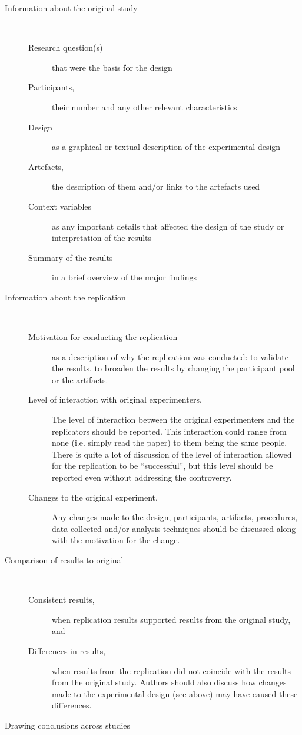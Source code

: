 \documentclass{uvamscse}
\begin{document}
\begin{description}
  \item[Information about the original study]~\\
    \begin{description}
    \item[Research question(s)] that were the basis for the design
    \item[Participants,] their number and any other relevant characteristics
    \item[Design] as a graphical or textual description of the experimental design
    \item[Artefacts,] the description of them and/or links to the artefacts used
    \item[Context variables] as any important details that affected the design of the study or interpretation of the
results
    \item[Summary of the results] in a brief overview of the major findings
    \end{description}
  \item[Information about the replication]~\\
    \begin{description}
    \item[Motivation for conducting the replication] as a
description of why the replication was conducted:
to validate the results, to broaden the results by
changing the participant pool or the artifacts.
    \item[Level of interaction with original experimenters.]
The level of interaction between the original experimenters and the
replicators should be reported. This interaction could range from none (i.e.
simply read the  paper) to them being the same people. There is quite a lot of
discussion of the level of interaction allowed for the replication to be
``successful'', but this level should be reported even without  addressing
the controversy.
    \item[Changes to the original experiment.] Any changes made to the
design, participants, artifacts, procedures, data collected and/or analysis
techniques should be  discussed along with the motivation for the change.
    \end{description}
  \item[Comparison of results to original]~\\
    \begin{description}
    \item[Consistent results,] when replication results supported
results from the original study, and
    \item[Differences in results,] when results from the replication
did not coincide with the results from the original study.
Authors should also discuss how changes made to the
experimental design (see above) may have caused
these differences.
    \end{description}
    \item[Drawing conclusions across studies]
\end{description}
\end{document}

